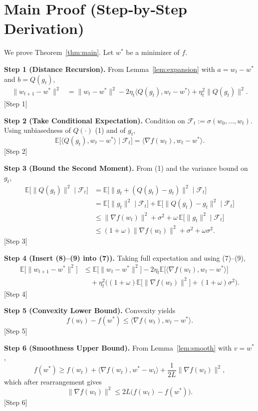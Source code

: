 \documentclass{article}
\newcommand{\E}{\mathbb{E}}
\begin{document}
\section*{Main Proof (Step‑by‑Step Derivation)}
We prove Theorem~\ref{thm:main}. Let $w^{*}$ be a minimizer of $f$.

\noindent\textbf{Step 1 (Distance Recursion).}  
From Lemma~\ref{lem:expansion} with $a=w_t-w^{*}$ and $b=Q(g_t)$,
\begin{align}
\|w_{t+1}-w^{*}\|^{2}
&= \|w_t-w^{*}\|^{2}
-2\eta_t\langle Q(g_t),w_t-w^{*}\rangle
+\eta_t^{2}\|Q(g_t)\|^{2}. \tag{7}
\end{align}
[Step 1]

\noindent\textbf{Step 2 (Take Conditional Expectation).}  
Condition on $\mathcal{F}_t:=\sigma(w_0,\dots,w_t)$.
Using unbiasedness of $Q(\cdot)$ (1) and of $g_t$,
\[
\E\!\big[\langle Q(g_t),w_t-w^{*}\rangle\mid\mathcal{F}_t\big]
= \langle \nabla f(w_t),w_t-w^{*}\rangle . \tag{8}
\]
[Step 2]

\noindent\textbf{Step 3 (Bound the Second Moment).}  
From (1) and the variance bound on $g_t$,
\begin{align}
\E\!\big[\|Q(g_t)\|^{2}\mid\mathcal{F}_t\big]
&= \E\!\big[\|g_t+ (Q(g_t)-g_t)\|^{2}\mid\mathcal{F}_t\big] \nonumber\\
&= \E\!\big[\|g_t\|^{2}\mid\mathcal{F}_t\big]
   +\E\!\big[\|Q(g_t)-g_t\|^{2}\mid\mathcal{F}_t\big] \nonumber\\
&\le \|\nabla f(w_t)\|^{2} + \sigma^{2}
   +\omega\,\E\!\big[\|g_t\|^{2}\mid\mathcal{F}_t\big] \nonumber\\
&\le (1+\omega)\|\nabla f(w_t)\|^{2} + \sigma^{2} +\omega\sigma^{2} .
\tag{9}
\end{align}
[Step 3]

\noindent\textbf{Step 4 (Insert (8)–(9) into (7)).}
Taking full expectation and using (7)–(9),
\begin{align}
\E\!\big[\|w_{t+1}-w^{*}\|^{2}\big]
&\le \E\!\big[\|w_{t}-w^{*}\|^{2}\big]
-2\eta_t \E\!\big[\langle\nabla f(w_t),w_t-w^{*}\rangle\big] \nonumber\\
&\quad +\eta_t^{2}\Big((1+\omega)\E\!\big[\|\nabla f(w_t)\|^{2}\big]
      + (1+\omega)\sigma^{2}\Big). \tag{10}
\end{align}
[Step 4]

\noindent\textbf{Step 5 (Convexity Lower Bound).}  
Convexity yields
\[
f(w_t)-f(w^{*}) \le \langle\nabla f(w_t),w_t-w^{*}\rangle .
\tag{11}
\]
[Step 5]

\noindent\textbf{Step 6 (Smoothness Upper Bound).}  
From Lemma~\ref{lem:smooth} with $v=w^{*}$,
\[
f(w^{*})\ge f(w_t)+\langle\nabla f(w_t),w^{*}-w_t\rangle
            +\frac{1}{2L}\|\nabla f(w_t)\|^{2},
\]
which after rearrangement gives
\[
\|\nabla f(w_t)\|^{2}\le 2L\big(f(w_t)-f(w^{*})\big). \tag{12}
\]
[Step 6]
\end{document}
